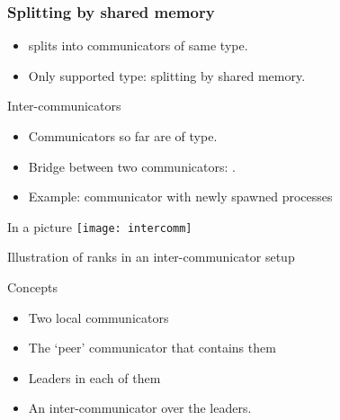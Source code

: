 \begin{frame}[containsverbatim]\frametitle{Splitting by shared memory}
  \begin{itemize}
  \item
     splits into communicators of same type.
  \item Only supported type:  splitting by
    shared memory.
  \end{itemize}

\end{frame}

\begin{mpithree}
\begin{frame}{Inter-communicators}
\label{sl:comm-inter}
  \begin{itemize}
  \item Communicators so far are of  type.
  \item Bridge between two communicators: .
  \item Example: communicator with newly spawned processes
  \end{itemize}  
\end{frame}
\end{mpithree}

\begin{mpithree}
\begin{frame}{In a picture}
  \label{sl:intercomm-picture}
  \texttt{[image: intercomm]}

  Illustration of ranks in an inter-communicator setup
\end{frame}
\end{mpithree}

\begin{mpithree}
\begin{frame}{Concepts}
  \label{sl:intercomm-concepts}
  \begin{itemize}
  \item Two local communicators
  \item The `peer' communicator that contains them
  \item Leaders in each of them
  \item An inter-communicator over the leaders.
  \end{itemize}
\end{frame}
\end{mpithree}

